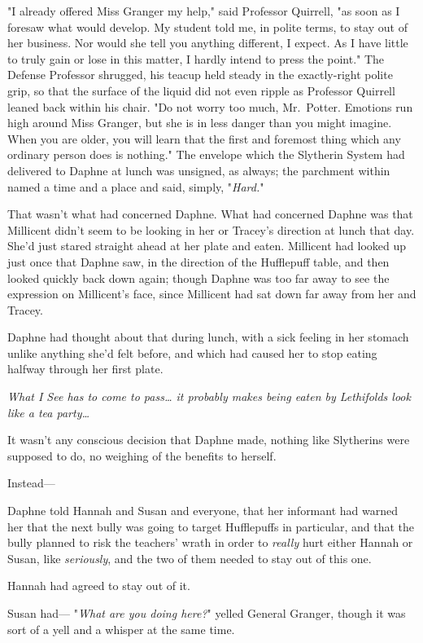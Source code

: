 "I already offered Miss Granger my help," said Professor Quirrell, "as soon as 
I foresaw what would develop. My student told me, in polite terms, to stay out 
of her business. Nor would she tell you anything different, I expect. As I have 
little to truly gain or lose in this matter, I hardly intend to press the 
point." The Defense Professor shrugged, his teacup held steady in the 
exactly-right polite grip, so that the surface of the liquid did not even 
ripple as Professor Quirrell leaned back within his chair. "Do not worry too 
much, Mr.~Potter. Emotions run high around Miss Granger, but she is in less 
danger than you might imagine. When you are older, you will learn that the 
first and foremost thing which any ordinary person does is nothing."
\sbreak
The envelope which the Slytherin System had delivered to Daphne at lunch was 
unsigned, as always; the parchment within named a time and a place and said, 
simply, "\emph{Hard.}"

That wasn't what had concerned Daphne. What had concerned Daphne was that 
Millicent didn't seem to be looking in her or Tracey's direction at lunch that 
day. She'd just stared straight ahead at her plate and eaten. Millicent had 
looked up just once that Daphne saw, in the direction of the Hufflepuff table, 
and then looked quickly back down again; though Daphne was too far away to see 
the expression on Millicent's face, since Millicent had sat down far away from 
her and Tracey.

Daphne had thought about that during lunch, with a sick feeling in her stomach 
unlike anything she'd felt before, and which had caused her to stop eating 
halfway through her first plate.

\emph{What I See has to come to pass{\ldots} it probably makes being eaten by 
Lethifolds look like a tea party{\ldots}}

It wasn't any conscious decision that Daphne made, nothing like Slytherins were 
supposed to do, no weighing of the benefits to herself.

Instead---

Daphne told Hannah and Susan and everyone, that her informant had warned her 
that the next bully was going to target Hufflepuffs in particular, and that the 
bully planned to risk the teachers' wrath in order to \emph{really} hurt either 
Hannah or Susan, like \emph{seriously}, and the two of them needed to stay out 
of this one.

Hannah had agreed to stay out of it.

Susan had---
\sbreak
"\emph{What are you doing here?}" yelled General Granger, though it was sort of 
a yell and a whisper at the same time.

